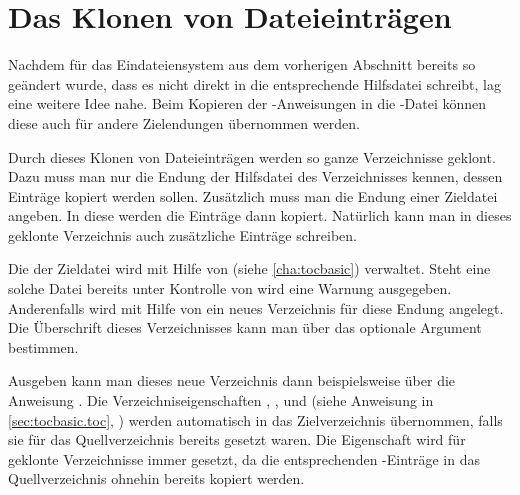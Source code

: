 \section{Das Klonen von Dateieinträgen}

Nachdem  für das Eindateiensystem aus
dem vorherigen Abschnitt bereits so geändert wurde, dass es nicht direkt in
die entsprechende Hilfsdatei schreibt, lag eine weitere Idee nahe. Beim
Kopieren der -Anweisungen in die -Datei können
diese auch für andere Zielendungen übernommen werden.

\begin{Declaration}
\end{Declaration}%
Durch dieses Klonen von Dateieinträgen werden so ganze Verzeichnisse
geklont. Dazu muss man nur die Endung der Hilfsdatei des Verzeichnisses
kennen, dessen Einträge kopiert werden sollen. Zusätzlich muss man die Endung
einer Zieldatei angeben. In diese werden die Einträge dann kopiert. Natürlich
kann man in dieses geklonte Verzeichnis auch zusätzliche Einträge
schreiben.

Die  der Zieldatei wird mit Hilfe von
\hyperref[cha:tocbasic]{}%
 (siehe
\autoref{cha:tocbasic}) verwaltet. Steht eine solche Datei bereits unter
Kontrolle von \hyperref[cha:tocbasic]{} wird eine Warnung
ausgegeben. Anderenfalls wird mit Hilfe von
\hyperref[cha:tocbasic]{} ein neues Verzeichnis für diese
Endung angelegt. Die Überschrift dieses Verzeichnisses kann man über das
optionale Argument  bestimmen.

Ausgeben kann man dieses neue Verzeichnis dann beispielsweise über die
Anweisung . Die
Verzeichniseigenschaften
, ,  und 
(siehe Anweisung  in
\autoref{sec:tocbasic.toc}, ) werden
automatisch in das Zielverzeichnis übernommen, falls sie für das
Quellverzeichnis bereits gesetzt waren. Die Eigenschaft  wird
für geklonte Verzeichnisse immer gesetzt, da die entsprechenden
-Einträge in das Quellverzeichnis ohnehin bereits kopiert
werden.

